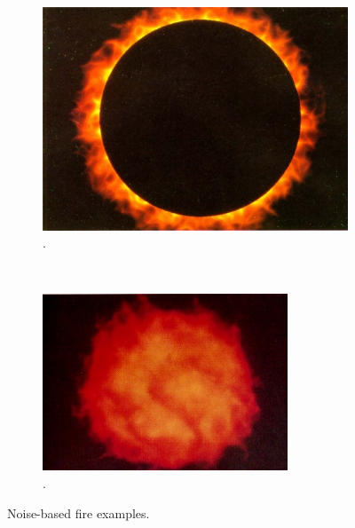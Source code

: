 \begin{figure}[htpb!]
        \centering
        \begin{subfigure}[b]{0.45\textwidth}
                \includegraphics[width=\textwidth]{img/perlin_1985}
                \caption{\cite{Perlin:1985}.}
        \end{subfigure}%
        ~ %
        \begin{subfigure}[b]{0.45\textwidth}
                \includegraphics[width=\textwidth]{img/perlin_1989}
                \caption{\cite{Perlin:1989}.}
        \end{subfigure}  
        \caption{Noise-based fire examples.}
        \label{fig:noise_based}
\end{figure}

